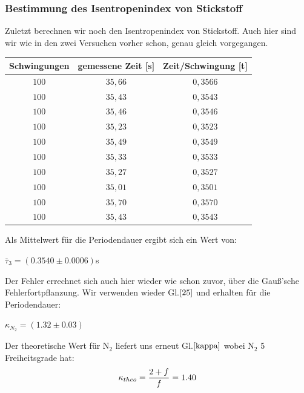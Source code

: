\documentclass{article}
\begin{document}
{{\subsubsection{Bestimmung des Isentropenindex von Stickstoff}
Zuletzt berechnen wir noch den Isentropenindex von Stickstoff. Auch hier sind wir wie in den zwei Versuchen vorher schon, genau gleich vorgegangen.
\newpage
\begin{center}
\begin{tabular}{c|c|c}
Schwingungen & gemessene Zeit [s]& Zeit/Schwingung [t]\\
\hline 
\(100\)	& \(35,66\)	& \(0,3566\)\\
\(100\)	& \(35,43\)	& \(0,3543\)\\
\(100\)	& \(35,46\)	& \(0,3546\)\\
\(100\)	& \(35,23\)	& \(0,3523\)\\
\(100\)	& \(35,49\)	& \(0,3549\)\\
\(100\)	& \(35,33\)	& \(0,3533\)\\
\(100\)	& \(35,27\)	& \(0,3527\)\\
\(100\)	& \(35,01\)	& \(0,3501\)\\
\(100\)	& \(35,70\)	& \(0,3570\)\\
\(100\)	& \(35,43\)	& \(0,3543\)\\
\end{tabular}
\end{center}

\vspace{1cm}
Als Mittelwert für die Periodendauer ergibt sich ein Wert von:
\begin{center}
\(\overline{\tau}_{3} = (0.3540 \pm 0.0006)\)s
\end{center}

Der Fehler errechnet sich auch hier wieder wie schon zuvor, über die Gauß'sche Fehlerfortpflanzung.
Wir verwenden wieder Gl.\(\eqref{25}\) und erhalten für die Periodendauer:
\begin{center}
\(\kappa_{N_2} = (1.32 \pm 0.03)\)
\end{center}

Der theoretische Wert für N\(_2\) liefert uns erneut Gl.\(\eqref{kappa}\) wobei N\(_2\) 5 Freiheitsgrade hat:
\begin{equation}
\notag
\kappa_{theo} = \frac{2+f}{f} = 1.40
\end{equation}

}}
\end{document}
